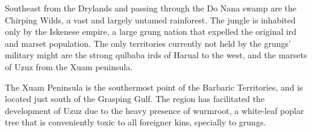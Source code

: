 Southeast from the Drylands and passing through the Do Nana swamp are the Chirping Wilds, a vast and largely untamed rainforest.
The jungle is inhabited only by the Iskenese empire, a large grung nation that expelled the original ird and marset population.
The only territories currently not held by the grungs' military might are the strong qulbaba irds of Harual to the west, and the marsets of Uzuz from the Xuam peninsula.

The Xuam Peninsula is the southermost point of the Barbaric Territories, and is located just south of the Grasping Gulf.
The region has facilitated the development of Uzuz due to the heavy presence of wurmroot, a white-leaf poplar tree that is conveniently toxic to all foreigner kins, specially to grungs.
